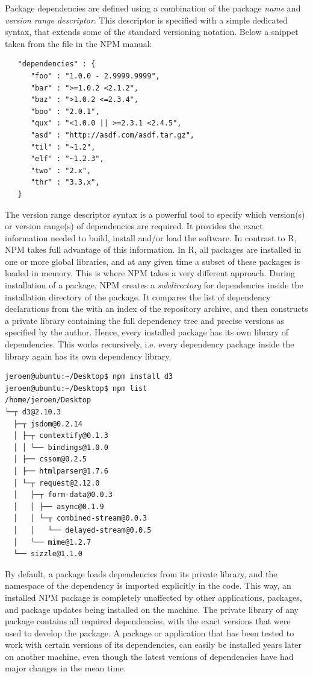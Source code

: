 Package dependencies are defined using a combination of the package \emph{name}
and \emph{version range descriptor}. This descriptor is specified with a
simple dedicated syntax, that extends some of the standard versioning notation.
Below a snippet taken from the  file in the NPM manual:

\begin{verbatim}
   "dependencies" : {
      "foo" : "1.0.0 - 2.9999.9999",
      "bar" : ">=1.0.2 <2.1.2",
      "baz" : ">1.0.2 <=2.3.4",
      "boo" : "2.0.1",
      "qux" : "<1.0.0 || >=2.3.1 <2.4.5",
      "asd" : "http://asdf.com/asdf.tar.gz",
      "til" : "~1.2",
      "elf" : "~1.2.3",
      "two" : "2.x",
      "thr" : "3.3.x",
   }
\end{verbatim}

\noindent The version range descriptor syntax is a powerful tool to specify
which version(s) or version range(s) of dependencies are required. It provides the exact
information needed to build, install and/or load the software. In contrast to R,
NPM takes full advantage of this information. In R, all packages are installed
in one or more global libraries, and at any given time a subset of these packages
is loaded in memory. This is where NPM takes a very different approach. During
installation of a package, NPM creates a \emph{subdirectory} for dependencies inside
the installation directory of the package. It compares the list of dependency
declarations from the  with an index of the repository archive,
and then constructs a private library containing the full dependency tree and precise
versions as specified by the author. Hence, every installed package has its own library
of dependencies. This works recursively, i.e. every dependency package inside
the library again has its own dependency library.

\begin{verbatim}
jeroen@ubuntu:~/Desktop$ npm install d3
jeroen@ubuntu:~/Desktop$ npm list
/home/jeroen/Desktop
└─┬ d3@2.10.3
  ├─┬ jsdom@0.2.14
  │ ├─┬ contextify@0.1.3
  │ │ └── bindings@1.0.0
  │ ├── cssom@0.2.5
  │ ├── htmlparser@1.7.6
  │ └─┬ request@2.12.0
  │   ├─┬ form-data@0.0.3
  │   │ ├── async@0.1.9
  │   │ └─┬ combined-stream@0.0.3
  │   │   └── delayed-stream@0.0.5
  │   └── mime@1.2.7
  └── sizzle@1.1.0
\end{verbatim}

\noindent By default, a package loads dependencies from its private library, and
the namespace of the dependency is imported explicitly in the code. This way, an
installed NPM package is completely unaffected by other applications, packages,
and package updates being installed on the machine. The private library of any
package contains all required dependencies, with the exact versions that
were used to develop the package. A package or application that has been
tested to work with certain versions of its dependencies, can easily be
installed years later on another machine, even though the latest versions of
dependencies have had major changes in the mean time.

